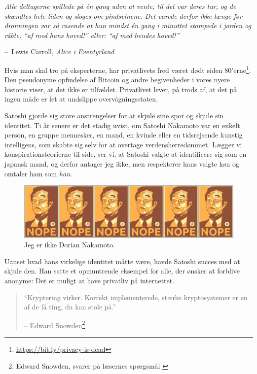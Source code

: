 \documentclass[paper=6in:9in,pagesize=pdftex,headinclude=on,footinclude=on,12pt]{scrbook}
\makeatletter
\newenvironment{chapquote}[2][4em]{\setlength{\@tempdima}{#1}%
   \def\chapquote@author{#2}%
   \parshape 1 \@tempdima \dimexpr\textwidth-2\@tempdima\relax%
   \itshape}{\par\normalfont\hfill--\ \chapquote@author\hspace*{\@tempdima}\par\bigskip}
\makeatother
\begin{document}
\begin{chapquote}{Lewis Carroll, \textit{Alice i Eventyrland}} Alle deltagerne spillede på \'en gang uden at vente, til det var deres tur, og de skændtes hele tiden og sloges om pindsvinene. Det varede derfor ikke længe før dronningen var så rasende at hun mindst \'en gang i minuttet stampede i jorden og råbte: \enquote{af med hans hoved!} eller: \enquote{af med hendes hoved!} \end{chapquote}

Hvis man skal tro på eksperterne, har privatlivets fred været dødt siden 80'erne\footnote{\url{https://bit.ly/privacy-is-dead}}. Den pseudonyme opfindelse af Bitcoin og andre begivenheder i vores nyere historie viser, at det ikke er tilfældet. Privatlivet lever, på trods af, at det på ingen måde er let at undslippe overvågningsstaten.

Satoshi gjorde sig store anstrengelser for at skjule sine spor og skjule sin identitet. Ti år senere er det stadig uvist, om Satoshi Nakamoto var en enkelt person, en gruppe mennesker, en mand, en kvinde eller en tidsrejsende kunstig intelligens, som skabte sig selv for at overtage verdensherredømmet. Lægger vi konspirationsteorierne til side, ser vi, at Satoshi valgte at identificere sig som en japansk mand, og derfor antager jeg ikke, men respekterer hans valgte køn og omtaler ham som \textit{han}.\begin{figure}
  \includegraphics{assets/images/nope.png}
  \caption{Jeg er ikke Dorian Nakamoto.}
  \label{fig:nope}
\end{figure}

Uanset hvad hans virkelige identitet måtte være, havde Satoshi succes med at skjule den. Han satte et opmuntrende eksempel for alle, der ønsker at forblive anonyme: Det er muligt at have privatliv på internettet.\begin{quotation}\begin{samepage} \enquote{Kryptering virker. Korrekt implementerede, stærke kryptosystemer er en af de få ting, du kan stole på.} \begin{flushright} -- Edward Snowden\footnote{Edward Snowden, svarer på læsernes spørgsmål \cite{snowden}}
\end{flushright}\end{samepage}\end{quotation}
\end{document}
